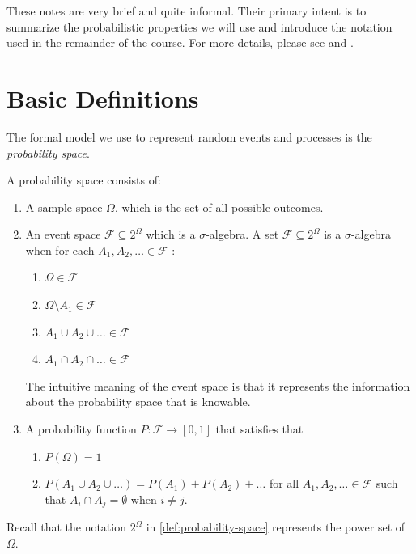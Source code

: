 \documentclass[letterpaper,11pt]{article}
\author{Marek Petrik}
\date{}
\begin{document}
\maketitle

These notes are very brief and quite informal. Their primary intent is to summarize the probabilistic properties we will use and introduce the notation used in the remainder of the course. For more details, please see \cite[chapter 6]{Deisenroth2021} and \cite[chapters 1 and 2]{Bertsekas2000}.


\section{Basic Definitions}

The formal model we use to represent random events and processes is the \emph{probability space}.

\begin{defn} \label{def:probability-space}
  A probability space consists of:
  \begin{enumerate}
  \item A sample space $\Omega$, which is the set of all possible outcomes. 
  \item An event space $\mathcal{F} \subseteq 2^{\Omega}$ which is a $\sigma$-algebra. A set $\mathcal{F} \subseteq 2^{\Omega}$ is a $\sigma$-algebra when for each $A_1, A_2, \dots \in \mathcal{F}$ :
  \begin{enumerate}
  \item $\Omega\in \mathcal{F}$
  \item  $\Omega \setminus A_1 \in \mathcal{F}$
  \item $A_1 \cup A_2 \cup \dots \in  \mathcal{F}$
  \item $A_1 \cap A_2 \cap \dots \in \mathcal{F}$
  \end{enumerate}
  The intuitive meaning of the event space is that it represents the information about the probability space that is knowable.
\item A probability function $P\colon \mathcal{F} \to [0,1]$ that satisfies that
  \begin{enumerate}
  \item $P(\Omega) = 1$
  \item $P(A_1 \cup A_2 \cup \dots) = P(A_1) + P(A_2) + \dots$ for all $A_1, A_2, \dots \in \mathcal{F}$ such that $A_i \cap A_j = \emptyset$ when $i \neq j$.
  \end{enumerate}
  \end{enumerate}
\end{defn}
Recall that the notation $2^{\Omega}$ in \cref{def:probability-space} represents the power set of $\Omega$.
\end{document}
